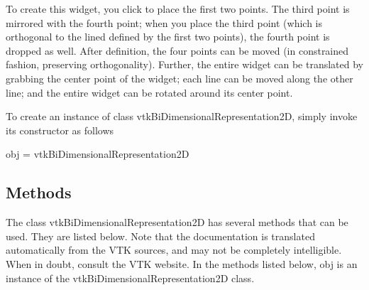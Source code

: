 To create this widget, you click to place the first two points. The third point is mirrored with the fourth point; when you place the third point (which is orthogonal to the lined defined by the first two points), the fourth point is dropped as well. After definition, the four points can be moved (in constrained fashion, preserving orthogonality). Further, the entire widget can be translated by grabbing the center point of the widget; each line can be moved along the other line; and the entire widget can be rotated around its center point.

To create an instance of class vtk\-Bi\-Dimensional\-Representation2\-D, simply invoke its constructor as follows \begin{DoxyVerb}  obj = vtkBiDimensionalRepresentation2D
\end{DoxyVerb}
 \hypertarget{vtkwidgets_vtkxyplotwidget_Methods}{}\subsection{Methods}\label{vtkwidgets_vtkxyplotwidget_Methods}
The class vtk\-Bi\-Dimensional\-Representation2\-D has several methods that can be used. They are listed below. Note that the documentation is translated automatically from the V\-T\-K sources, and may not be completely intelligible. When in doubt, consult the V\-T\-K website. In the methods listed below, {\ttfamily obj} is an instance of the vtk\-Bi\-Dimensional\-Representation2\-D class. 
